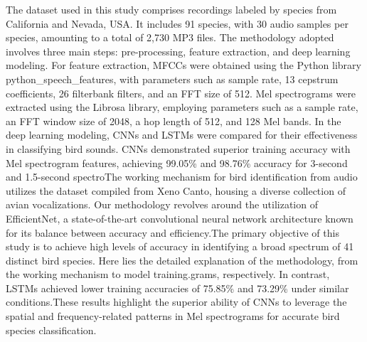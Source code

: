 The dataset used in this study\cite{carvalho2023automatic} comprises recordings
labeled by species from California and Nevada, USA. It includes 91 species,
with 30 audio samples per species, amounting to a total of 2,730 MP3 files. The
methodology adopted involves three main steps: pre-processing, feature
extraction, and deep learning modeling. For feature extraction, MFCCs were
obtained using the Python library python\_speech\_features, with parameters
such as sample rate, 13 cepstrum coefficients, 26 filterbank filters, and an
FFT size of 512. Mel spectrograms were extracted using the Librosa library,
employing parameters such as a sample rate, an FFT window size of 2048, a hop
length of 512, and 128 Mel bands. In the deep learning modeling, CNNs and LSTMs
were compared for their effectiveness in classifying bird sounds. CNNs
demonstrated superior training accuracy with Mel spectrogram features,
achieving 99.05\% and 98.76\% accuracy for 3-second and 1.5-second spectroThe
working mechanism for bird identification from audio utilizes the dataset
compiled from Xeno Canto, housing a diverse collection of avian vocalizations.
Our methodology revolves around the utilization of EfficientNet, a
state-of-the-art convolutional neural network architecture known for its
balance between accuracy and efficiency.The primary objective of this study is to achieve high levels of accuracy in
identifying a broad spectrum of 41 distinct bird species. Here lies the
detailed explanation of the methodology, from the working mechanism to model
training.grams, respectively. In contrast, LSTMs achieved lower training
accuracies of 75.85\% and 73.29\% under similar conditions.These results
highlight the superior ability of CNNs to leverage the spatial and
frequency-related patterns in Mel spectrograms for accurate bird species
classification.\\

